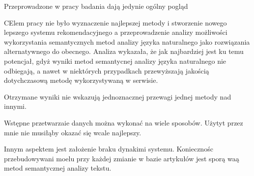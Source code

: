 \documentclass[pl]{minipw} %
\begin{document}
Przeprowadzone w pracy badania dają jedynie ogólny pogląd

CElem pracy nie było wyznaczenie najlepszej metody i stworzenie nowego lepszego systemu rekomendacyjnego a przeprowadzenie analizy możliwości wykorzystania semantycznych metod analizy języka naturalnego jako rozwiązania alternatywnego do obecnego. Analiza wykazała, że jak najbardziej jest ku temu potencjał, gdyż wyniki metod semantycnej analizy języka naturalnego nie odbiegają, a nawet w niektórych przypadkach przewyższają jakością dotychczasową metodę wykorzystywaną w serwisie.

Otrzymane wyniki nie wskazują jednoznacznej przewagi jednej metody nad innymi.

Wstępne przetwarzaie danych można wykonać na wiele sposobów. Użytyt przez mnie nie musiłąby okazać się wcale najlepszy.

Innym aspektem jest założenie braku dynakimi systemu. Koniecznośc przebudowywani moelu przy każdej zmianie w bazie artykułów jest sporą waą metod semantycznej analizy tekstu.
\end{document}
